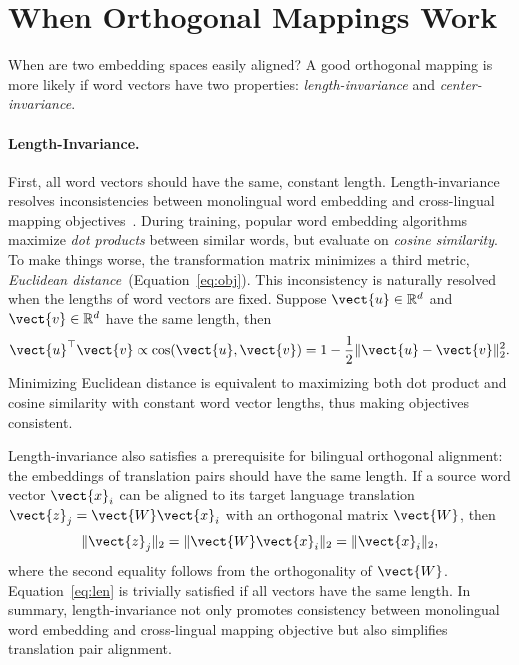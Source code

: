 \section{When Orthogonal Mappings Work}
\label{sec:property}

When are two embedding spaces easily aligned? A good
orthogonal mapping is more likely if word vectors have two
properties: \emph{length-invariance} and \emph{center-invariance}.

\paragraph{Length-Invariance.}
%
First, all word vectors should have the same, constant
length.
Length-invariance resolves inconsistencies between monolingual word
embedding and cross-lingual mapping objectives~\citep{xing-15}.
During training, popular word embedding
algorithms~\cite{mikolov-13-fixed,pennington-14,bojanowski-17} maximize
\emph{dot products} between similar words, but evaluate on
\emph{cosine similarity}.
%
To make things worse, the transformation matrix 
minimizes a third metric, \emph{Euclidean
  distance}~(Equation~\ref{eq:obj}).
This inconsistency is naturally resolved when the lengths of word
vectors are fixed.
Suppose $\vect{u} \in \mathbb{R}^d$ and $\vect{v} \in \mathbb{R}^d$
have the same length, then
\begin{equation*}
\vect{u}^\top \vect{v} \propto \cos(\vect{u},\vect{v})
= 1 - \frac{1}{2} \| \vect{u} - \vect{v} \|_2^2.
\end{equation*}
Minimizing Euclidean distance is equivalent to maximizing both dot
product and cosine similarity with constant word vector lengths, thus
making objectives consistent.

Length-invariance also satisfies a prerequisite for bilingual
orthogonal alignment: the embeddings of translation pairs should have the same
length.
If a source word vector $\vect{x}_i$ can be aligned to its target language
translation $\vect{z}_j = \vect{W} \vect{x}_i$ with an orthogonal matrix
$\vect{W}$, then 
\begin{equation}\label{eq:len}
  \| \vect{z}_j \|_2 = \| \vect{W} \vect{x}_i \|_2 = \| \vect{x}_i \|_2,
\end{equation}
where the second equality follows from the orthogonality of $\vect{W}$.
Equation~\eqref{eq:len} is trivially satisfied if all vectors have the same
length.
%
In summary, length-invariance not only promotes consistency between
monolingual word embedding and cross-lingual mapping objective but
also simplifies translation pair alignment.

